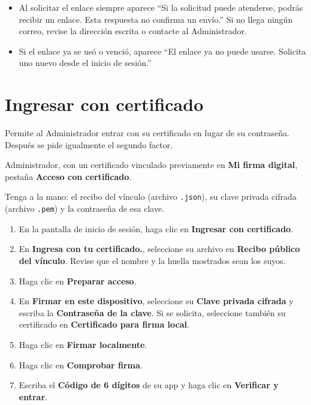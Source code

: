\begin{itemize}
  \item Al solicitar el enlace siempre aparece \enquote{Si la solicitud puede
        atenderse, podrás recibir un enlace. Esta respuesta no confirma un
        envío.} Si no llega ningún correo, revise la dirección escrita o
        contacte al Administrador.
  \item Si el enlace ya se usó o venció, aparece \enquote{El enlace ya no
        puede usarse. Solicita uno nuevo desde el inicio de sesión.}
\end{itemize}

\section{Ingresar con certificado}\label{sec:ingresar-certificado}

\paraque Permite al Administrador entrar con su certificado en lugar de su
contraseña. Después se pide igualmente el segundo factor.

\disponible Administrador, con un certificado vinculado previamente en
\textbf{Mi firma digital}, pestaña \textbf{Acceso con certificado}.

Tenga a la mano: el recibo del vínculo (archivo \texttt{.json}), su clave
privada cifrada (archivo \texttt{.pem}) y la contraseña de esa clave.

\pasos
\begin{enumerate}
  \item En la pantalla de inicio de sesión, haga clic en
        \textbf{Ingresar con certificado}.
  \item En \textbf{Ingresa con tu certificado.}, seleccione su archivo en
        \textbf{Recibo público del vínculo}. Revise que el nombre y la huella
        mostrados sean los suyos.
  \item Haga clic en \textbf{Preparar acceso}.
  \item En \textbf{Firmar en este dispositivo}, seleccione su
        \textbf{Clave privada cifrada} y escriba la
        \textbf{Contraseña de la clave}. Si se solicita, seleccione también
        su certificado en \textbf{Certificado para firma local}.
  \item Haga clic en \textbf{Firmar localmente}.
  \item Haga clic en \textbf{Comprobar firma}.
  \item Escriba el \textbf{Código de 6 dígitos} de su app y haga clic en
        \textbf{Verificar y entrar}.
\end{enumerate}

